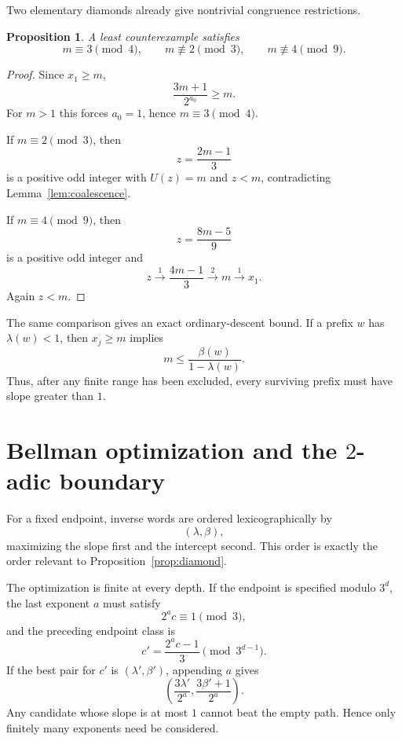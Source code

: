 \documentclass[11pt,reqno]{amsart}
\numberwithin{equation}{section}
\newtheorem{proposition}[theorem]{Proposition}
\theoremstyle{definition}
\theoremstyle{remark}
\begin{document}
Two elementary diamonds already give nontrivial congruence restrictions.

\begin{proposition}\label{prop:initialcongruences}
A least counterexample satisfies
\[
 m\equiv3\pmod4,
 \qquad
 m\not\equiv2\pmod3,
 \qquad
 m\not\equiv4\pmod9.
\]
\end{proposition}

\begin{proof}
Since $x_1\ge m$,
\[
 \frac{3m+1}{2^{a_0}}\ge m.
\]
For $m>1$ this forces $a_0=1$, hence $m\equiv3\pmod4$.

If $m\equiv2\pmod3$, then
\[
 z=\frac{2m-1}{3}
\]
is a positive odd integer with $U(z)=m$ and $z<m$, contradicting Lemma~\ref{lem:coalescence}.

If $m\equiv4\pmod9$, then
\[
 z=\frac{8m-5}{9}
\]
is a positive odd integer and
\[
 z\xrightarrow{1}\frac{4m-1}{3}
 \xrightarrow{2}m
 \xrightarrow{1}x_1.
\]
Again $z<m$.
\end{proof}

The same comparison gives an exact ordinary-descent bound.  If a prefix $w$ has $\lambda(w)<1$, then $x_j\ge m$ implies
\begin{equation}\label{eq:ordinarydescent}
 m\le \frac{\beta(w)}{1-\lambda(w)}.
\end{equation}
Thus, after any finite range has been excluded, every surviving prefix must have slope greater than $1$.

\section{Bellman optimization and the $2$-adic boundary}\label{sec:bellman}

For a fixed endpoint, inverse words are ordered lexicographically by
\[
 (\lambda,\beta),
\]
maximizing the slope first and the intercept second.  This order is exactly the order relevant to Proposition~\ref{prop:diamond}.

The optimization is finite at every depth.  If the endpoint is specified modulo $3^d$, the last exponent $a$ must satisfy
\[
 2^a c\equiv1\pmod3,
\]
and the preceding endpoint class is
\[
 c'=\frac{2^ac-1}{3}\pmod{3^{d-1}}.
\]
If the best pair for $c'$ is $(\lambda',\beta')$, appending $a$ gives
\begin{equation}\label{eq:bellmanrec}
 \left(\frac{3\lambda'}{2^a},
       \frac{3\beta'+1}{2^a}\right).
\end{equation}
Any candidate whose slope is at most $1$ cannot beat the empty path.  Hence only finitely many exponents need be considered.
\end{document}
